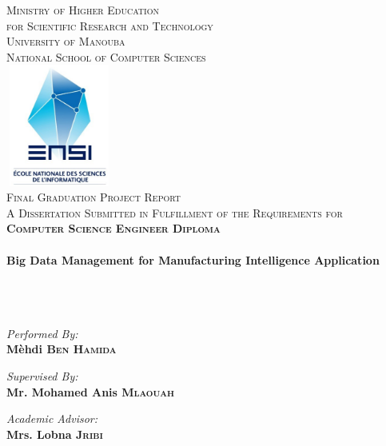 \begin{titlepage}
\thispagestyle{test}
\begin{center}

\textsc{Ministry of Higher Education \\ for Scientific Research and Technology\\
University of Manouba\\National School of Computer Sciences}
\\[0.7cm]
   
\includegraphics[width=3.5cm,height=4cm]{./logoEnsi}~\\[1.5cm]

\textsc{\large Final Graduation Project Report}\\[1cm]

\textsc{ A Dissertation Submitted in Fulfillment of the Requirements for\\ \Large{\textbf{Computer Science Engineer Diploma}}}\\[0.5cm]

\HRule \\[0.4cm]
{\huge \bfseries Big Data Management for Manufacturing Intelligence Application \\[0.4cm] }
\HRule \\[0.5cm]

~\\
~\\

\begin{minipage}{0.4\textwidth}
\begin{flushleft} \large
\emph{Performed By:}\\
\textbf{Mèhdi \textsc{\bf Ben Hamida}\\} 
\end{flushleft}
\end{minipage}
\begin{minipage}{0.4\textwidth}
\begin{flushright} \large
\emph{Supervised By:} \\
\textbf{Mr. Mohamed Anis \textsc{\bf Mlaouah}\\} 
\end{flushright}
\begin{flushright} \large
\emph{Academic Advisor:} \\
\textbf{Mrs. Lobna \textsc{\bf Jribi}\\} 
\end{flushright}
\end{minipage}



\end{center}
\end{titlepage}

